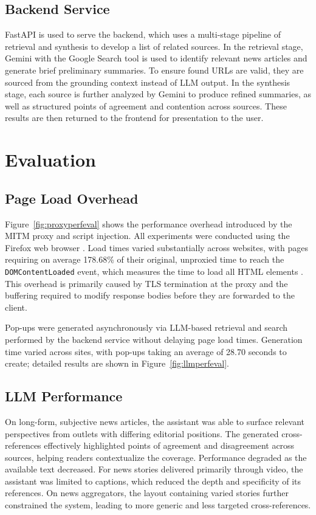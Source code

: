 \documentclass[11pt]{article}
\begin{document}
\subsection{Backend Service}
FastAPI \cite{fastapi} is used to serve the backend, which uses a multi-stage pipeline of retrieval and synthesis to develop a list of related sources. In the retrieval stage, Gemini \cite{google_gemini} with the Google Search tool is used to identify relevant news articles and generate brief preliminary summaries. To ensure found URLs are valid, they are sourced from the grounding context instead of LLM output. In the synthesis stage, each source is further analyzed by Gemini to produce refined summaries, as well as structured points of agreement and contention across sources. These results are then returned to the frontend for presentation to the user.

\section{Evaluation}

\subsection{Page Load Overhead}
Figure~\ref{fig:proxyperfeval} shows the performance overhead introduced by the MITM proxy and script injection. All experiments were conducted using the Firefox web browser \cite{firefox}. Load times varied substantially across websites, with pages requiring on average 178.68\% of their original, unproxied time to reach the \texttt{DOMContentLoaded} event, which measures the time to load all HTML elements \cite{mdn_domcontentloaded}. This overhead is primarily caused by TLS termination at the proxy and the buffering required to modify response bodies before they are forwarded to the client.

Pop-ups were generated asynchronously via LLM-based retrieval and search performed by the backend service without delaying page load times. Generation time varied across sites, with pop-ups taking an average of 28.70 seconds to create; detailed results are shown in Figure~\ref{fig:llmperfeval}.

\subsection{LLM Performance}
On long-form, subjective news articles, the assistant was able to surface relevant perspectives from outlets with differing editorial positions. The generated cross-references effectively highlighted points of agreement and disagreement across sources, helping readers contextualize the coverage. Performance degraded as the available text decreased. For news stories delivered primarily through video, the assistant was limited to captions, which reduced the depth and specificity of its references. On news aggregators, the layout containing varied stories further constrained the system, leading to more generic and less targeted cross-references.
\end{document}
